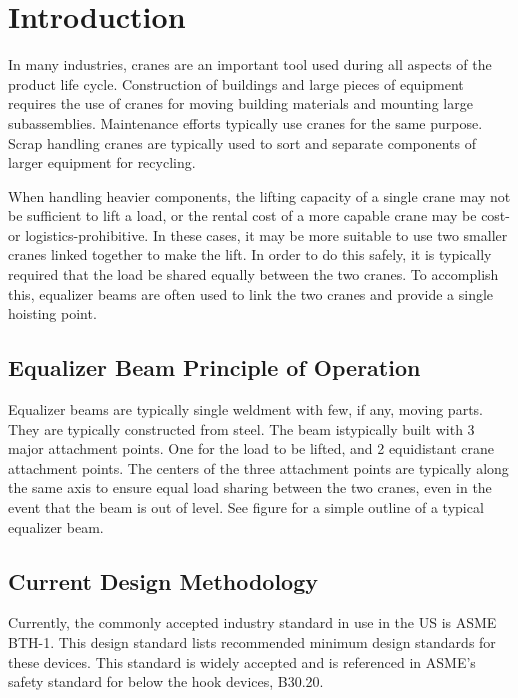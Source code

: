 \chapter{Introduction}
In many industries, cranes are an important tool used during all aspects of the product life cycle. Construction of buildings and large pieces of equipment requires the use of cranes for moving building materials and mounting large subassemblies. Maintenance efforts typically use cranes for the same purpose. Scrap handling cranes are typically used to sort and separate components of larger equipment for recycling.

When handling heavier components, the lifting capacity of a single crane may not be sufficient to lift a load, or the rental cost of a more capable crane may be cost- or logistics-prohibitive. In these cases, it may be more suitable to use two smaller cranes linked together to make the lift. In order to do this safely, it is typically required that the load be shared equally between the two cranes. To accomplish this, equalizer beams are often used to link the two cranes and provide a single hoisting point.

\section{Equalizer Beam Principle of Operation} 

Equalizer beams are typically single weldment with few, if any, moving parts. They are typically constructed from steel. The beam istypically built with 3 major attachment points. One for the load to be lifted, and 2 equidistant crane attachment points. The centers of the three attachment points are typically along the same axis to ensure equal load sharing between the two cranes, even in the event that the beam is out of level. See figure  for a simple outline of a typical equalizer beam.

\section{Current Design Methodology}

Currently, the commonly accepted industry standard in use in the US is ASME BTH-1. This design standard lists recommended minimum design standards for these devices. This standard is widely accepted and is referenced in ASME's safety standard for below the hook devices, B30.20. 
